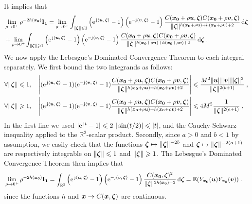\documentclass{elsarticle}
\def\R{\mbox{$\mathbb{R}$}}
\begin{document}
\medskip

It implies that
\begin{align*}
&\lim_{\rho\to 0^+}\rho^{-2h(\vect{x_0})}\mat{I_1}=\lim_{\rho\to 0^+}\int_{\lVert \vect{\zeta} \rVert\leq 1}\left(\expj{\ip{\vect{u}}{\vect{\zeta}}}-1\right)\left(\eu^{-\jj \ip{\vect{v}}{\vect{\zeta}}}-1\right)\frac{C(\vect{x_0}+\rho \vect{u},\vect{\zeta})C(\vect{x_0}+\rho \vect{v},\vect{\zeta})}{\lVert \vect{\zeta} \rVert^{h(\vect{x_0}+\rho \vect{u})+h(\vect{x_0}+\rho \vect{v})+2}}\dif \vect{\zeta}\\
&+\lim_{\rho\to 0^+}\int_{\lVert \vect{\zeta} \rVert\geq 1}\left(\expj{\ip{\vect{u}}{\vect{\zeta}}}-1\right)\left(\eu^{-\jj \ip{\vect{v}}{\vect{\zeta}}}-1\right)\frac{C(\vect{x_0}+\rho \vect{u},\vect{\zeta})C(\vect{x_0}+\rho \vect{v},\vect{\zeta})}{\lVert \vect{\zeta} \rVert^{h(\vect{x_0}+\rho \vect{u})+h(\vect{x_0}+\rho \vect{v})+2}}\dif \vect{\zeta}\;.
\end{align*}
We now apply the Lebesgue's Dominated Convergence Theorem to each integral separately. We first bound the two integrands as follows:
\begin{align*}
& \forall \lVert \bm{\zeta} \rVert\leqslant 1,\quad  \left|(\mathrm{e}^{\, \mathrm{j} \left \langle \bm{u},\, \bm{\zeta}\right \rangle}-1)(\mathrm{e}^{-\mathrm{j} \left \langle \bm{v},\, \bm{\zeta}\right \rangle}-1)\frac{C(\bm{x_0}+\rho \bm{u},\bm{\zeta})C(\bm{x_0}+\rho \bm{v},\bm{\zeta})}{\lVert \bm{\zeta} \rVert^{h(\bm{x_0}+\rho \bm{u})+h(\bm{x_0}+\rho \bm{v})+2}}\right|\leqslant \frac{M^2\|\bm{u}\|\|\bm{v}\|\lVert \bm{\zeta} \rVert^2}{\lVert \bm{\zeta} \rVert^{2(b+1)}}\;,\\ 
&\forall \lVert \bm{\zeta} \rVert\geqslant 1, \quad \left|(\mathrm{e}^{\, \mathrm{j} \left \langle \bm{u},\, \bm{\zeta}\right \rangle}-1)(\mathrm{e}^{-\mathrm{j} \left \langle \bm{v},\, \bm{\zeta}\right \rangle}-1)\frac{C(\bm{x_0}+\rho \bm{u},\bm{\zeta})C(\bm{x_0}+\rho \bm{v},\bm{\zeta})}{\lVert \bm{\zeta} \rVert^{h(\bm{x_0}+\rho \bm{u})+h(\bm{x_0}+\rho \bm{v})+2}}\right|\leqslant 4M^2\frac{1}{\lVert \bm{\zeta} \rVert^{2(a+1)}}\;,
\end{align*}
In the first line we used $|\mathrm{e}^{\, \mathrm{j} t}-1|\leqslant 2~|\sin(t/2)|\leqslant |t|$, and the Cauchy-Schwarz inequality applied to the $\R^2$-scalar product. Secondly, since $a>0$ and $b<1$ by assumption, we easily check that the functions $\bm{\zeta}\mapsto \lVert \bm{\zeta} \rVert^{-2b}$ and $\bm{\zeta}\mapsto \lVert \bm{\zeta} \rVert^{-2(a+1)}$ are respectively integrable on $\lVert \bm{\zeta} \rVert\leqslant 1$ and $\lVert \bm{\zeta} \rVert\geqslant 1$. The Lebesgue's Dominated Convergence Theorem then implies that
\begin{align*}
&\lim_{\rho\to 0^+}\rho^{-2h(\vect{x_0})}\mat{I_1}=\int_{\mathbb{R}^2}\left(\expj{\ip{\vect{u}}{\vect{\zeta}}}-1\right)\left(\eu^{-\jj \ip{\vect{v}}{\vect{\zeta}}}-1\right)\frac{C(\vect{x_0},\vect{\zeta})^2}{\lVert \vect{\zeta} \rVert^{2h(\vect{x_0})+2}}\dif \vect{\zeta}=\mathbb{E}(Y_{\vect{x_0}}(\vect{u})Y_{\vect{x_0}}(\vect{v}))\;.
\end{align*}
since the functions $h$ and $\bm{x} \to C(\bm{x} , \bm{\zeta})$ are continuous.\\
\end{document}
